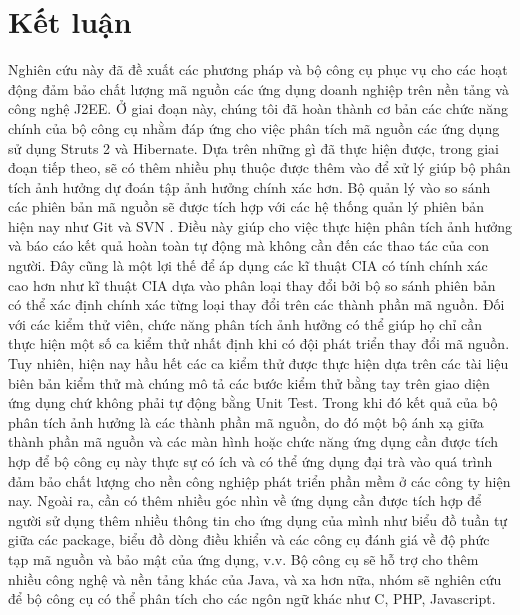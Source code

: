 \documentclass[12pt]{report}
\begin{document}
\chapter{Kết luận}
Nghiên cứu này đã đề xuất các phương pháp và bộ công cụ phục vụ cho các hoạt động đảm bảo chất lượng mã nguồn các ứng dụng doanh nghiệp trên nền tảng và công nghệ J2EE. Ở giai đoạn này, chúng tôi đã hoàn thành cơ bản các chức năng chính của bộ công cụ nhằm đáp ứng cho việc phân tích mã nguồn các ứng dụng sử dụng Struts 2 và Hibernate. Dựa trên những gì đã thực hiện được, trong giai đoạn tiếp theo, sẽ có thêm nhiều phụ thuộc được thêm vào để xử lý giúp bộ phân tích ảnh hưởng dự đoán tập ảnh hưởng chính xác hơn. Bộ quản lý vào so sánh các phiên bản mã nguồn sẽ được tích hợp với các hệ thống quản lý phiên bản hiện nay như Git  và SVN . Điều này giúp cho việc thực hiện phân tích ảnh hưởng và báo cáo kết quả hoàn toàn tự động mà không cần đến các thao tác của con người. Đây cũng là một lợi thế để áp dụng các kĩ thuật CIA có tính chính xác cao hơn như kĩ thuật CIA dựa vào phân loại thay đổi bởi bộ so sánh phiên bản có thể xác định chính xác từng loại thay đổi trên các thành phần mã nguồn. Đối với các kiểm thử viên, chức năng phân tích ảnh hưởng có thể giúp họ chỉ cần thực hiện một số ca kiểm thử nhất định khi có đội phát triển thay đổi mã nguồn. Tuy nhiên, hiện nay hầu hết các ca kiểm thử được thực hiện dựa trên các tài liệu biên bản kiểm thử mà chúng mô tả các bước kiểm thử bằng tay trên giao diện ứng dụng chứ không phải tự động bằng Unit Test. Trong khi đó kết quả của bộ phân tích ảnh hưởng là các thành phần mã nguồn, do đó một bộ ánh xạ giữa thành phần mã nguồn và các màn hình hoặc chức năng ứng dụng cần được tích hợp để bộ công cụ này thực sự có ích và có thể ứng dụng đại trà vào quá trình đảm bảo chất lượng cho nền công nghiệp phát triển phần mềm ở các công ty hiện nay. Ngoài ra, cần có thêm nhiều góc nhìn về ứng dụng cần được tích hợp để người sử dụng thêm nhiều thông tin cho ứng dụng của mình như biểu đồ tuần tự giữa các package, biểu đồ dòng điều khiển và các công cụ đánh giá về độ phức tạp mã nguồn và bảo mật của ứng dụng, v.v. Bộ công cụ sẽ hỗ trợ cho thêm nhiều công nghệ và nền tảng khác của Java, và xa hơn nữa, nhóm sẽ nghiên cứu để bộ công cụ có thể phân tích cho các ngôn ngữ khác như C, PHP, Javascript.
\end{document}
